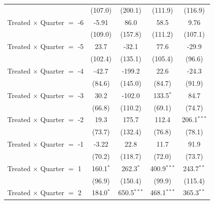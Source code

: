 \begin{longtable}{lcccc}
                                  & (107.0)                              & (200.1)         & (111.9)         & (116.9)         \\
  Treated $\times$ Quarter $=$ -6 & -5.91                                & 86.0            & 58.5            & 9.76            \\
                                  & (109.0)                              & (157.8)         & (111.2)         & (107.1)         \\
  Treated $\times$ Quarter $=$ -5 & 23.7                                 & -32.1           & 77.6            & -29.9           \\
                                  & (102.4)                              & (135.1)         & (105.4)         & (96.6)          \\
  Treated $\times$ Quarter $=$ -4 & -42.7                                & -199.2          & 22.6            & -24.3           \\
                                  & (84.6)                               & (145.0)         & (84.7)          & (91.9)          \\
  Treated $\times$ Quarter $=$ -3 & 30.2                                 & -102.0          & 133.5$^{*}$     & 84.7            \\
                                  & (66.8)                               & (110.2)         & (69.1)          & (74.7)          \\
  Treated $\times$ Quarter $=$ -2 & 19.3                                 & 175.7           & 112.4           & 206.1$^{***}$   \\
                                  & (73.7)                               & (132.4)         & (76.8)          & (78.1)          \\
  Treated $\times$ Quarter $=$ -1 & -3.22                                & 22.8            & 11.7            & 91.9            \\
                                  & (70.2)                               & (118.7)         & (72.0)          & (73.7)          \\
  Treated $\times$ Quarter $=$ 1  & 160.1$^{*}$                          & 262.3$^{*}$     & 400.9$^{***}$   & 243.7$^{**}$    \\
                                  & (96.9)                               & (150.4)         & (99.9)          & (115.4)         \\
  Treated $\times$ Quarter $=$ 2  & 184.0$^{*}$                          & 650.5$^{***}$   & 468.1$^{***}$   & 365.3$^{**}$    \\

\end{longtable}
